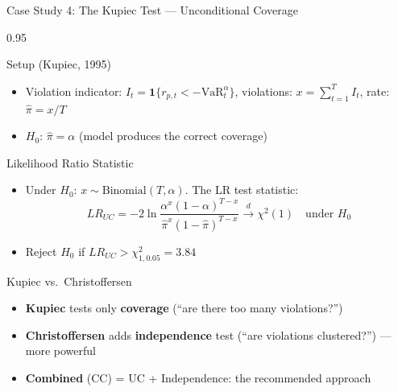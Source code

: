 \documentclass[9pt, aspectratio=169, t]{beamer}
\begin{document}
\begin{frame}{Case Study 4: The Kupiec Test --- Unconditional Coverage}
    \begin{cminipage}{0.95\textwidth}
    \vspace{-3mm}
    {\scriptsize
    \begin{block}{Setup (Kupiec, 1995)}
        \begin{itemize}\setlength{\itemsep}{0pt}
            \item Violation indicator: $I_t = \mathbf{1}\{r_{p,t} < -\text{VaR}_t^\alpha\}$, violations: $x = \sum_{t=1}^T I_t$, rate: $\hat{\pi} = x/T$
            \item $H_0$: $\hat{\pi} = \alpha$ (model produces the correct coverage)
        \end{itemize}
    \end{block}
    \vspace{-2mm}
    \begin{block}{Likelihood Ratio Statistic}
        \begin{itemize}\setlength{\itemsep}{0pt}
            \item Under $H_0$: $x \sim \text{Binomial}(T, \alpha)$. The LR test statistic:
            \vspace{-2mm}
            \[
                LR_{UC} = -2\ln\frac{\alpha^x(1-\alpha)^{T-x}}{\hat{\pi}^x(1-\hat{\pi})^{T-x}} \xrightarrow{d} \chi^2(1) \quad \text{under } H_0
            \]
            \vspace{-3mm}
            \item Reject $H_0$ if $LR_{UC} > \chi^2_{1,0.05} = 3.84$
        \end{itemize}
    \end{block}
    \vspace{-2mm}
    \begin{alertblock}{Kupiec vs.\ Christoffersen}
        \begin{itemize}\setlength{\itemsep}{0pt}
            \item \textbf{Kupiec} tests only \textbf{coverage} (``are there too many violations?'')
            \item \textbf{Christoffersen} adds \textbf{independence} test (``are violations clustered?'') --- more powerful
            \item \textbf{Combined} (CC) = UC + Independence: the recommended approach
        \end{itemize}
    \end{alertblock}
    }
    \end{cminipage}
\end{frame}
\end{document}
